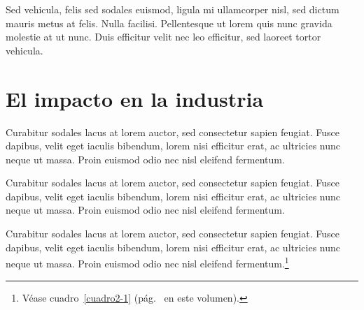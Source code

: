 Sed vehicula, felis sed sodales euismod, ligula mi ullamcorper nisl, sed dictum mauris metus at felis. Nulla facilisi. Pellentesque ut lorem quis nunc gravida molestie at ut nunc. Duis efficitur velit nec leo efficitur, sed laoreet tortor vehicula.

\section{El impacto en la industria}

Curabitur sodales lacus at lorem auctor, sed consectetur sapien feugiat. Fusce dapibus, velit eget iaculis bibendum, lorem nisi efficitur erat, ac ultricies nunc neque ut massa. Proin euismod odio nec nisl eleifend fermentum.

Curabitur sodales lacus at lorem auctor, sed consectetur sapien feugiat. Fusce dapibus, velit eget iaculis bibendum, lorem nisi efficitur erat, ac ultricies nunc neque ut massa. Proin euismod odio nec nisl eleifend fermentum.

Curabitur sodales lacus at lorem auctor, sed consectetur sapien feugiat. Fusce dapibus, velit eget iaculis bibendum, lorem nisi efficitur erat, ac ultricies nunc neque ut massa. Proin euismod odio nec nisl eleifend fermentum.\footnote{Véase cuadro~\ref{cuadro2-1} (pág.~\pageref{cuadro2-1} en este volumen).}

